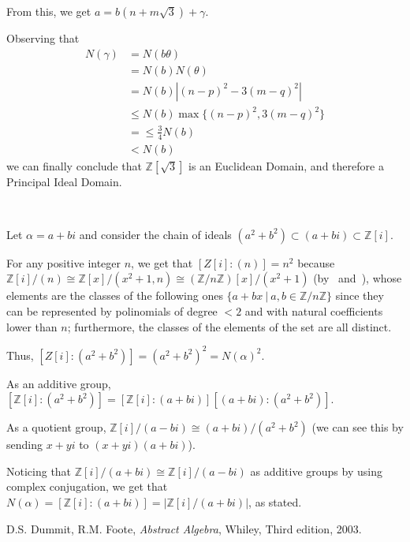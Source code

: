 \documentclass{article}
\newcommand{\numberset}{\mathbb}
\newcommand{\Z}{\numberset{Z}}
\newcommand{\exercise}[1]{\noindent {\bf Exercise #1}}
\begin{document}
From this, we get $a = b(n + m\sqrt 3) + \gamma$.

Observing that
\begin{align*}
		N(\gamma) & = N(b \theta) \\
		& = N(b) N(\theta) \\
		& = N(b) | (n - p)^2 - 3 (m - q)^2 | \\
		& \leq N(b) \max\{ (n - p)^2, 3(m - q)^2\} \\
		& = \leq\frac 3 4 N(b) \\
		& < N(b)
\end{align*}
we can finally conclude that $\Z[\sqrt{3}]$ is an Euclidean Domain, and therefore a Principal Ideal Domain.


~\\
\exercise{17}

Let $\alpha=a+bi$ and consider the chain of ideals $(a^2+b^2)\subset (a+bi)\subset\Z[i]$.

For any positive integer $n$, we get that $[Z[i]:(n)]=n^2$ because $\Z[i]/(n)\cong\Z[x]/(x^2+1,n)\cong(\Z/n\Z)[x]/(x^2+1)$ (by~\cite[chap. 7, thm 8(2)]{dumf} and~\cite[chap. 9, prop. 2]{dumf}), whose elements are the classes of the following ones $\{a+bx\ |\ a,b\in\Z/n\Z\}$ since they can be represented by polinomials of degree $<2$ and with natural coefficients lower than $n$; furthermore, the classes of the elements of the set are all distinct.

Thus, $[Z[i]:(a^2+b^2)]=(a^2+b^2)^2=N(\alpha)^2$.

As an additive group, $[\Z[i]:(a^2+b^2)]=[\Z[i]:(a+bi)][(a+bi):(a^2+b^2)]$.

As a quotient group, $\Z[i]/(a-bi)\cong(a+bi)/(a^2+b^2)$ (we can see this by sending $x+yi$ to $(x+yi)(a+bi)$).

Noticing that $\Z[i]/(a+bi)\cong\Z[i]/(a-bi)$ as additive groups by using complex conjugation, we get that $N(\alpha)=[\Z[i]:(a+bi)]=|\Z[i]/(a+bi)|$, as stated.

\begin{thebibliography}{9}
	D.S. Dummit, R.M. Foote,
	\textit{Abstract Algebra},
	Whiley,
	Third edition,
	2003.
\end{thebibliography}
\end{document}
